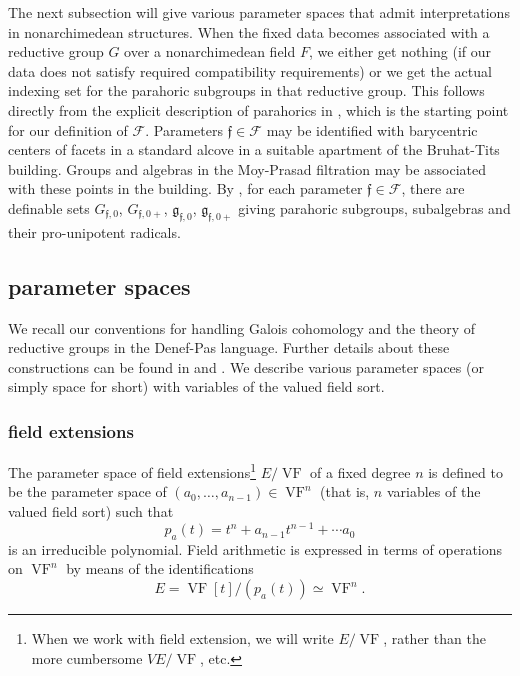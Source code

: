 \documentclass[12pt]{amsart}
\newcommand{\op}[1]{\operatorname{#1}}
\def\VF{{\op{VF}}}
\def\s{{\mathfrak{f}}}
\newcommand{\cF}{\mathcal{F}}
\newcommand{\fg}{\mathfrak{g}}
\theoremstyle{plain}
\theoremstyle{definition}
\begin{document}
The next subsection will give various parameter spaces that admit
interpretations in nonarchimedean structures.  When the fixed data
becomes associated with a reductive group $G$ over a nonarchimedean
field $F$, we either get nothing (if our data does not satisfy
required compatibility requirements) or we get the actual indexing set
for the parahoric subgroups in that reductive group.  This follows
directly from the explicit description of parahorics in \cite{Gross},
which is the starting point for our definition of $\cF$.  Parameters
$\s\in \cF$ may be identified with barycentric centers of facets in a
standard alcove in a suitable apartment of the Bruhat-Tits building.
Groups and algebras in the Moy-Prasad filtration may be associated
with these points in the building.  By \cite{CGH}, for each parameter
$\s\in \cF$, there are definable sets $G_{\s,0}$, $G_{\s,0+}$,
$\fg_{\s,0}$, $\fg_{\s,0+}$ giving parahoric subgroups, subalgebras
and their pro-unipotent radicals.


\subsection{parameter spaces}

We recall our conventions for handling Galois cohomology and the
theory of reductive groups in the Denef-Pas language.  Further details
about these constructions can be found in \cite{CHL} and \cite{CGH}.
We describe
various parameter spaces (or simply space for short) with variables of
the valued field sort.  


\subsubsection{field extensions}

The parameter space of field extensions\footnote{When we work with
  field extension, we will write $E/\VF$, rather than the more
  cumbersome $VE/\VF$, etc.} $E/\VF$ of a fixed degree $n$ is defined
to be the parameter space of $(a_0,\ldots,a_{n-1})\in \VF^n$ (that is,
$n$ variables of the valued field sort) such that
\[
p_a(t) = t^n + a_{n-1} t^{n-1} + \cdots a_0
\]
is an irreducible polynomial.  Field arithmetic is expressed in terms
of operations on $\VF^n$ by means of the identifications
\[
E = \VF[t]/(p_a(t)) \simeq \VF^n.
\]
\end{document}
